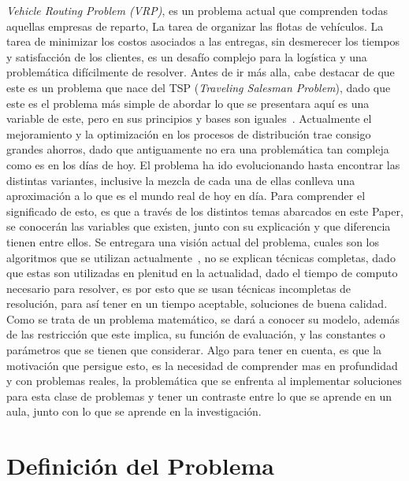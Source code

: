 \documentclass[letter, 10pt]{article}
\begin{document}
\emph{Vehicle Routing Problem (VRP)}, es un problema actual que comprenden todas aquellas empresas de reparto, La tarea de organizar las flotas
de veh\'iculos. La tarea de minimizar los costos asociados a las entregas, sin desmerecer los tiempos y satisfacci\'on de los clientes, es un desaf\'io
complejo para la log\'istica y una problem\'atica dif\'icilmente de resolver.
\newline
Antes de ir m\'as alla, cabe destacar de que este es un problema que nace del TSP (\emph{Traveling Salesman Problem}), dado que este es el problema
m\'as simple de abordar lo que se presentara aqu\'i es una variable de este, pero en sus principios y bases son iguales~\cite{TSP}.
\newline
Actualmente el mejoramiento y la optimizaci\'on en los procesos de distribuci\'on trae consigo grandes ahorros, dado que antiguamente no era una
problem\'atica tan compleja como es en los d\'ias de hoy. El problema ha ido evolucionando hasta encontrar las distintas variantes, inclusive la 
mezcla de cada una de ellas conlleva una aproximaci\'on a lo que es el mundo real de hoy en d\'ia. Para comprender el significado de esto,
es que a trav\'es de los distintos temas abarcados en este Paper, se conocer\'an las variables que existen, junto con su explicaci\'on y que diferencia
tienen entre ellos. Se entregara una visi\'on actual del problema, cuales son los algoritmos que se utilizan actualmente~\cite{Prosser93Hybrid}, no se explican t\'ecnicas 
completas, dado que estas son utilizadas en plenitud en la actualidad, dado el tiempo de computo necesario para resolver, es por esto que se usan 
t\'ecnicas incompletas de resoluci\'on, para as\'i tener en un tiempo aceptable, soluciones de buena calidad.
Como se trata de un problema matem\'atico, se dar\'a a conocer su modelo, adem\'as de las restricci\'on que este implica, su funci\'on de evaluaci\'on,
y las constantes o par\'ametros que se tienen que considerar.
\newline
Algo para tener en cuenta, es que la motivaci\'on que persigue esto, es la necesidad de comprender mas en profundidad y con problemas reales, la 
problem\'atica que se enfrenta al implementar soluciones para esta clase de problemas y tener un contraste entre lo que se aprende en un aula, junto
con lo que se aprende en la investigaci\'on.

\section{Definici\'on del Problema}
\end{document}

